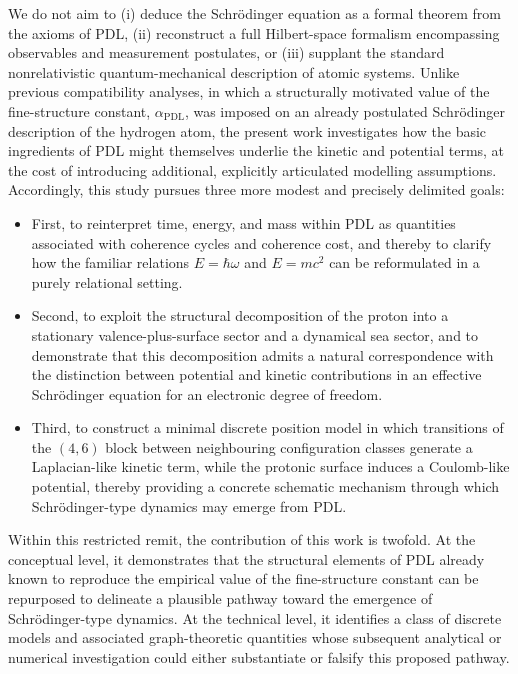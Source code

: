 \documentclass[11pt,a4paper]{article}
\begin{document}
We do not aim to (i) deduce the Schr\"odinger equation as a formal theorem from the axioms of PDL, (ii) reconstruct a full Hilbert-space formalism encompassing observables and measurement postulates, or (iii) supplant the standard nonrelativistic quantum-mechanical description of atomic systems. Unlike previous compatibility analyses, in which a structurally motivated value of the fine-structure constant, $\alpha_{\mathrm{PDL}}$, was imposed on an already postulated Schr\"odinger description of the hydrogen atom, the present work investigates how the basic ingredients of PDL might themselves underlie the kinetic and potential terms, at the cost of introducing additional, explicitly articulated modelling assumptions. Accordingly, this study pursues three more modest and precisely delimited goals:
\begin{itemize}
\item First, to reinterpret time, energy, and mass within PDL as quantities associated with coherence cycles and coherence cost, and thereby to clarify how the familiar relations $E = \hbar \omega$ and $E = mc^{2}$ can be reformulated in a purely relational setting.
\item Second, to exploit the structural decomposition of the proton into a stationary valence-plus-surface sector and a dynamical sea sector, and to demonstrate that this decomposition admits a natural correspondence with the distinction between potential and kinetic contributions in an effective Schr\"odinger equation for an electronic degree of freedom.
\item Third, to construct a minimal discrete position model in which transitions of the $(4,6)$ block between neighbouring configuration classes generate a Laplacian-like kinetic term, while the protonic surface induces a Coulomb-like potential, thereby providing a concrete schematic mechanism through which Schr\"odinger-type dynamics may emerge from PDL.
\end{itemize}
Within this restricted remit, the contribution of this work is twofold. At the conceptual level, it demonstrates that the structural elements of PDL already known to reproduce the empirical value of the fine-structure constant can be repurposed to delineate a plausible pathway toward the emergence of Schr\"odinger-type dynamics. At the technical level, it identifies a class of discrete models and associated graph-theoretic quantities whose subsequent analytical or numerical investigation could either substantiate or falsify this proposed pathway.
\end{document}
